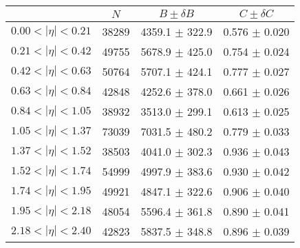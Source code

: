 \begin{tabular}{lccc}
\hline
    &   $N$   & $B \pm \delta B$  &  $C \pm \delta C$ \\
\hline
$0.00 < |\eta| <0.21$          & 38289      & 4359.1     $\pm$ 322.9 & 0.576      $\pm$ 0.020 \\
$0.21 < |\eta| <0.42$          & 49755      & 5678.9     $\pm$ 425.0 & 0.754      $\pm$ 0.024 \\
$0.42 < |\eta| <0.63$          & 50764      & 5707.1     $\pm$ 424.1 & 0.777      $\pm$ 0.027 \\
$0.63 < |\eta| <0.84$          & 42848      & 4252.6     $\pm$ 378.0 & 0.661      $\pm$ 0.026 \\
$0.84 < |\eta| <1.05$          & 38932      & 3513.0     $\pm$ 299.1 & 0.613      $\pm$ 0.025 \\
$1.05 < |\eta| <1.37$          & 73039      & 7031.5     $\pm$ 480.2 & 0.779      $\pm$ 0.033 \\
$1.37 < |\eta| <1.52$          & 38503      & 4041.0     $\pm$ 302.3 & 0.936      $\pm$ 0.043 \\
$1.52 < |\eta| <1.74$          & 54999      & 4997.9     $\pm$ 383.6 & 0.930      $\pm$ 0.042 \\
$1.74 < |\eta| <1.95$          & 49921      & 4847.1     $\pm$ 322.6 & 0.906      $\pm$ 0.040 \\
$1.95 < |\eta| <2.18$          & 48054      & 5596.4     $\pm$ 361.8 & 0.890      $\pm$ 0.041 \\
$2.18 < |\eta| <2.40$          & 42823      & 5837.5     $\pm$ 348.8 & 0.896      $\pm$ 0.039 \\
\hline
\end{tabular}
